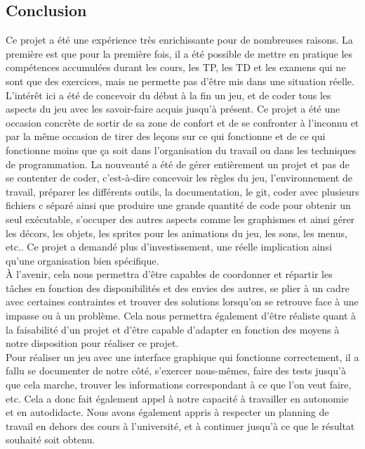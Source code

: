 \documentclass[a4paper,11pt]{article}
\begin{document}
\subsection{Conclusion}


Ce projet a été une expérience très enrichissante pour de nombreuses raisons. La première est que pour la première fois, il a été possible de mettre en pratique les compétences accumulées durant les cours, les TP, les TD et les examens qui ne sont que des exercices, mais ne permette pas d'être mis dans une situation réelle. L'intérêt ici a été de concevoir du début à la fin un jeu, et de coder tous les aspects du jeu avec les savoir-faire acquis jusqu'à présent. Ce projet a été une occasion concrète de sortir de sa zone de confort et de se confronter à l'inconnu et par la même occasion de tirer des leçons sur ce qui fonctionne et de ce qui fonctionne moins que ça soit dans l'organisation du travail ou dans les techniques de programmation. La nouveauté a été de gérer entièrement un projet et pas de se contenter de coder, c'est-à-dire concevoir les règles du jeu, l'environnement de travail, préparer les différents outils, la documentation, le git, coder avec plusieurs fichiers c séparé ainsi que produire une grande quantité de code pour obtenir un seul exécutable, s'occuper des autres aspects comme les graphismes et ainsi gérer les décors, les objets, les sprites pour les animations du jeu, les sons, les menus, etc.. Ce projet a demandé plus d'investissement, une réelle implication ainsi qu'une organisation bien spécifique.\\
À l'avenir, cela nous permettra d'être capables de coordonner et répartir les tâches en fonction des disponibilités et des envies des autres, se plier à un cadre avec certaines contraintes et trouver des solutions lorsqu'on se retrouve face à une impasse ou à un problème. Cela nous permettra également d'être réaliste quant à la faisabilité d'un projet et d'être capable d'adapter en fonction des moyens à notre disposition pour réaliser ce projet.\\ Pour réaliser un jeu avec une interface graphique qui fonctionne correctement, il a fallu se documenter de notre côté, s'exercer nous-mêmes, faire des tests jusqu'à que cela marche, trouver les informations correspondant à ce que l'on veut faire, etc. Cela a donc fait également appel à notre capacité à travailler en autonomie et en autodidacte. Nous avons également appris à respecter un planning de travail en dehors des cours à l'université, et à continuer jusqu'à ce que le résultat souhaité soit obtenu.\\
\end{document}

